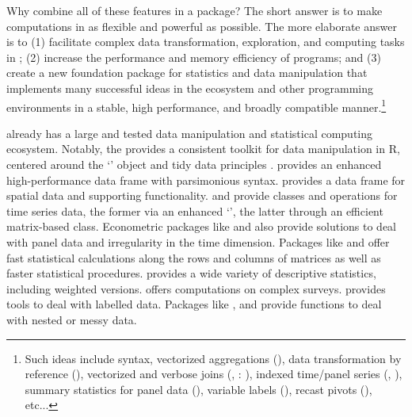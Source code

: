 \documentclass[article]{jss} %
\newcommand{\class}[1]{`\code{#1}'}
\begin{document}
Why combine all of these features in a package? The short answer is to make computations in  as flexible and powerful as possible. The more elaborate answer is to (1) facilitate complex data transformation, exploration, and computing tasks in ; (2) increase the performance and memory efficiency of  programs; %
and (3) create a new foundation package for statistics and data manipulation that implements many successful ideas in the  ecosystem and other programming environments in a stable, high performance, and broadly compatible manner.\footnote{Such ideas include  syntax, vectorized aggregations (), data transformation by reference (), vectorized and verbose joins (, : \citet{STATA}), indexed time/panel series (, ), summary statistics for panel data (), variable labels (), recast pivots (), etc...} \newline

 already has a large and tested data manipulation and statistical computing ecosystem. Notably, the  \citep{rtidyverse} provides a consistent toolkit for data manipulation in R, centered around the \class{tibble} \citep{rtibble} object and tidy data principles \citep{rtidydata}.  \citep{rdatatable} provides an enhanced high-performance data frame with parsimonious syntax.  \citep{rsf} provides a data frame for spatial data and supporting functionality.  \citep{rtsibble} and  \citep{rxts} provide classes and operations for time series data, the former via an enhanced \class{tibble}, the latter through an efficient matrix-based class. Econometric packages like  \citep{rplm} and  \citep{rfixest} also provide solutions to deal with panel data and irregularity in the time dimension. Packages like  \citep{rmatrixstats} and  \citep{rfast} offer fast statistical calculations along the rows and columns of matrices as well as faster statistical procedures.  \citep{rdesctools} provides a wide variety of descriptive statistics, including weighted versions.  \citep{rsurvey} offers computations on complex surveys.  \citep{rlabelled} provides tools to deal with labelled data. Packages like  \citep{rtidyr},  \citep{rpurrr} and  \citep{rrapply} provide functions to deal with nested or messy data. \newline
\end{document}
